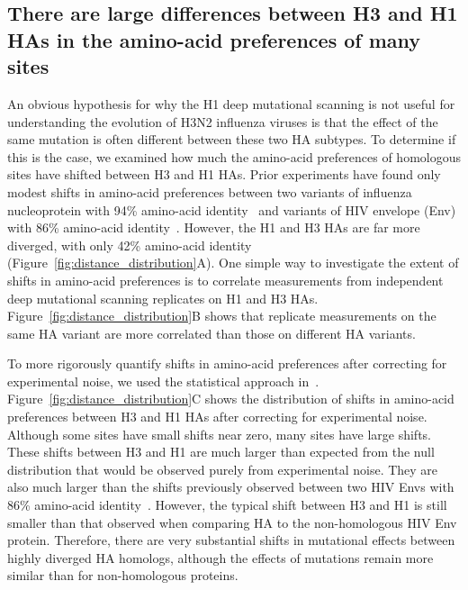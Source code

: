 \documentclass[9pt,twocolumn,twoside]{pnas-new}
\begin{document}
\subsection*{There are large differences between H3 and H1 HAs in the amino-acid preferences of many sites}
An obvious hypothesis for why the H1 deep mutational scanning is not useful for understanding the evolution of H3N2 influenza viruses is that the effect of the same mutation is often different between these two HA subtypes.
To determine if this is the case, we examined how much the amino-acid preferences of homologous sites have shifted between H3 and H1 HAs.
Prior experiments have found only modest shifts in amino-acid preferences between two variants of influenza nucleoprotein with 94\% amino-acid identity~\cite{doud2015site} and variants of HIV envelope (Env) with 86\% amino-acid identity~\cite{haddox2018mapping}.
However, the H1 and H3 HAs are far more diverged, with only 42\% amino-acid identity (Figure~\ref{fig:distance_distribution}A).
One simple way to investigate the extent of shifts in amino-acid preferences is to correlate measurements from independent deep mutational scanning replicates on H1 and H3 HAs.
Figure~\ref{fig:distance_distribution}B shows that replicate measurements on the same HA variant are more correlated than those on different HA variants.

To more rigorously quantify shifts in amino-acid preferences after correcting for experimental noise, we used the statistical approach in~\cite{doud2015site,haddox2018mapping}.
Figure~\ref{fig:distance_distribution}C shows the distribution of shifts in amino-acid preferences between H3 and H1 HAs after correcting for experimental noise.
Although some sites have small shifts near zero, many sites have large shifts.
These shifts between H3 and H1 are much larger than expected from the null distribution that would be observed purely from experimental noise.
They are also much larger than the shifts previously observed between two HIV Envs with 86\% amino-acid identity~\cite{haddox2018mapping}.
However, the typical shift between H3 and H1 is still smaller than that observed when comparing HA to the non-homologous HIV Env protein.
Therefore, there are very substantial shifts in mutational effects between highly diverged HA homologs, although the effects of mutations remain more similar than for non-homologous proteins.
\end{document}
